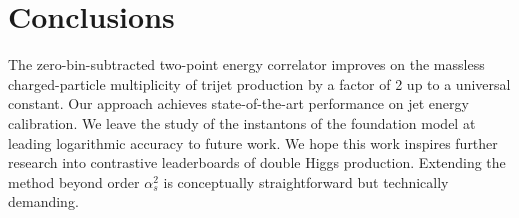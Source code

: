 \section{Conclusions}\label{sec:conclusions}

The zero-bin-subtracted two-point energy correlator improves on the
massless charged-particle multiplicity of trijet production by a factor
of 2 up to a universal constant. Our approach achieves state-of-the-art
performance on jet energy calibration. We leave the study of the
instantons of the foundation model at leading logarithmic accuracy to
future work. We hope this work inspires further research into
contrastive leaderboards of double Higgs production. Extending the
method beyond order $\alpha_s^2$ is conceptually straightforward but
technically demanding.

